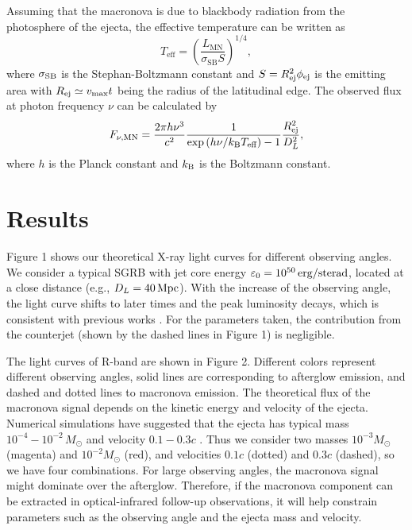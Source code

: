 \documentclass{emulateapj}
\begin{document}
Assuming that the macronova is due to blackbody radiation from the photosphere of the ejecta, the effective
temperature can
be written as%
\begin{equation}
T_{\text{eff}}=\left( \frac{L_{\text{MN}}}{\sigma
_{\text{SB}}S}\right) ^{1/4},
\end{equation}%
where $\sigma_{\rm SB}$ is the Stephan-Boltzmann constant and $S=R_{\rm ej}^2\phi_{\rm ej}$
is the emitting area with $R_{\rm ej}\simeq v_{\text{max}}t$ being the radius of the latitudinal edge. The observed flux at
photon frequency $\nu $ can be calculated by
\begin{equation}
F_{\nu ,\text{MN}}=\frac{2\pi h\nu ^{3}}{c^{2}}\frac{1}{\exp \left( h\nu /k_{%
\text{B}}T_{\text{eff}}\right) -1}\frac{R_{\rm ej}^{2}}{D_{L}^{2}},
\end{equation}
where $h$ is the Planck constant and $k_{\rm B}$ is the Boltzmann
constant.

\section{Results}
Figure 1 shows our theoretical X-ray light curves for different observing angles. We consider a typical SGRB with jet core energy $\varepsilon_0=10^{50}\,\rm erg/sterad$, located at a close distance (e.g., $D_L=40\,\rm Mpc$). With the increase of the observing angle, the light curve shifts to later times and the peak luminosity decays, which is consistent with previous works \citep[e.g.][]{mod00,huang00,gra02,lamb17}. For the parameters taken, the contribution from the counterjet (shown by the dashed lines in Figure 1) is negligible.

The light curves of R-band are shown in Figure 2. Different colors represent different observing angles, solid lines are corresponding to afterglow emission, and dashed and dotted lines to macronova emission. The theoretical flux of the macronova signal depends on the kinetic energy and velocity of the ejecta. Numerical simulations have suggested that the ejecta has typical mass $10^{-4}-10^{-2}\,M_{\odot}$ and velocity $0.1-0.3c$ \citep[e.g.][]{nag14}. Thus we consider two masses $10^{-3}M_{\odot}$ (magenta) and $10^{-2}M_{\odot}$ (red), and velocities $0.1c$ (dotted) and $0.3c$ (dashed), so we have four combinations. For large observing angles, the macronova signal might dominate over the afterglow. Therefore, if the macronova component can be extracted in optical-infrared follow-up observations, it will help constrain parameters such as the observing angle and the ejecta mass and velocity.
\end{document}
